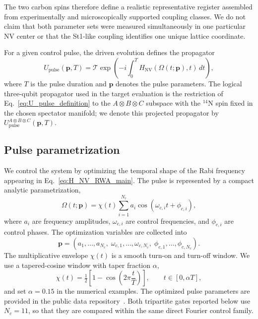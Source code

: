 \documentclass[
  aps,
  pra,
  reprint,            %
  superscriptaddress, %
  amsmath,amssymb,
  notitlepage
]{revtex4-2}
\begin{document}
The two carbon spins therefore define a realistic representative
register assembled from experimentally and microscopically supported
coupling classes. We do not claim that both parameter sets were
measured simultaneously in one particular NV center or that the
St1-like coupling identifies one unique lattice coordinate.

For a given control pulse, the driven evolution defines the propagator
\begin{equation}
U_{\mathrm{pulse}}(\mathbf p,T)
=
\mathcal{T}
\exp\!\left(
-i\int_0^T
H_{\mathrm{NV}}(\Omega(t;\mathbf p),t)\,dt
\right),
\label{eq:U_pulse_definition}
\end{equation}
where $T$ is the pulse duration and $\mathbf p$ denotes the pulse parameters. The logical three-qubit propagator used in the target evaluation is the restriction of Eq.~\eqref{eq:U_pulse_definition} to the $A\otimes B\otimes C$ subspace with the $^{14}\mathrm{N}$ spin fixed in the chosen spectator manifold; we denote this projected propagator by $U^{A\otimes B\otimes C}_{\mathrm{pulse}}(\mathbf p,T)$.

\subsection{Pulse parametrization}
\label{sec:pulse_parametrization}

We control the system by optimizing the temporal shape of the Rabi frequency appearing in Eq.~\eqref{eq:H_NV_RWA_main}. The pulse is represented by a compact analytic parametrization,
\begin{equation}
\Omega(t;\mathbf p) = \chi(t)\sum_{i=1}^{N_c} a_{i} \cos(\omega_{c,i} t + \phi_{c,i}),
\label{eq:pulse_parametrization}
\end{equation}
where $a_i$ are frequency amplitudes, $\omega_{c,i}$ are control frequencies, and $\phi_{c,i}$ are control phases. The optimization variables are collected into
\begin{equation}
\mathbf p =
(a_{1},\ldots,a_{N_c},\;
\omega_{c,1},\ldots,\omega_{c,N_c},\;
\phi_{c,1},\ldots,\phi_{c,N_c}).
\label{eq:pulse_parametrization_example}
\end{equation}
The multiplicative envelope $\chi(t)$ is a smooth turn-on and turn-off window. We use a tapered-cosine window with taper fraction $\alpha$,
\begin{equation}
\chi(t)=\tfrac12\left[1-\cos\!\left(2\pi\frac{t}{T}\right)\right], 
\qquad t\in[0,\alpha T],
\end{equation}
and set $\alpha=0.15$ in the numerical examples. The optimized pulse parameters are provided in the public data repository~\cite{baran2026_multiqubit_control}. Both tripartite gates reported below use $N_c=11$, so that they are compared within the same direct Fourier control family.
\end{document}
